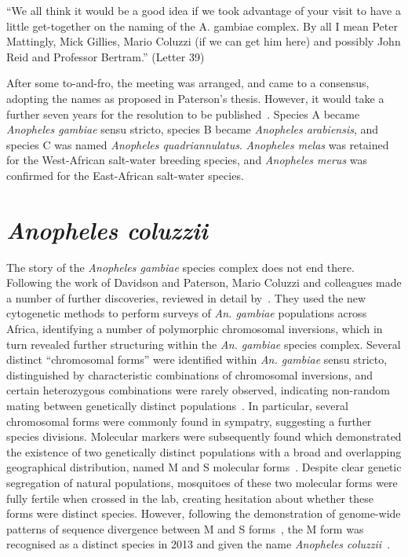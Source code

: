 \begin{refsection}
\begin{displayquote}
``We all think it would be a good idea if we took advantage of your visit to have a little get-together on the naming of the A. gambiae complex. By all I mean Peter Mattingly, Mick Gillies, Mario Coluzzi (if we can get him here) and possibly John Reid and Professor Bertram.'' (Letter 39)
\end{displayquote}


After some to-and-fro, the meeting was arranged, and came to a consensus, adopting the names as proposed in Paterson's thesis.
%
However, it would take a further seven years for the resolution to be published~\parencite{Mattingly1977}.
%
Species A became \textit{Anopheles gambiae} sensu stricto, species B became \textit{Anopheles arabiensis}, and species C was named \textit{Anopheles quadriannulatus}.
%
\textit{Anopheles melas} was retained for the West-African salt-water breeding species, and \textit{Anopheles merus} was confirmed for the East-African salt-water species.


\section{\textit{Anopheles coluzzii}}\label{sec:anopheles-coluzzii}


The story of the \textit{Anopheles gambiae} species complex does not end there. 
Following the work of Davidson and Paterson, Mario Coluzzi and colleagues made a number of further discoveries, reviewed in detail by~\textcite{Powell2014}.
%
They used the new cytogenetic methods to perform surveys of \textit{An. gambiae} populations across Africa, identifying a number of polymorphic chromosomal inversions, which in turn revealed further structuring within the \textit{An. gambiae} species complex.
%
Several distinct ``chromosomal forms'' were identified within \textit{An. gambiae} sensu stricto, distinguished by characteristic combinations of chromosomal inversions, and certain heterozygous combinations were rarely observed, indicating non-random mating between genetically distinct populations~\parencite{Toure1998,Coluzzi2002}.
%
In particular, several chromosomal forms were commonly found in sympatry, suggesting a further species divisions.
%
Molecular markers were subsequently found which demonstrated the existence of two genetically distinct populations with a broad and overlapping geographical distribution, named M and S molecular forms~\parencite{dellaTorre2001}.
%
Despite clear genetic segregation of natural populations, mosquitoes of these two molecular forms were fully fertile when crossed in the lab, creating hesitation about whether these forms were distinct species.
%
However, following the  demonstration of genome-wide patterns of sequence divergence between M and S forms~\parencite{Lawniczak2010}, the M form was recognised as a distinct species in 2013 and given the name \textit{Anopheles coluzzii}~\parencite{Coetzee2013}. 



\end{refsection}
